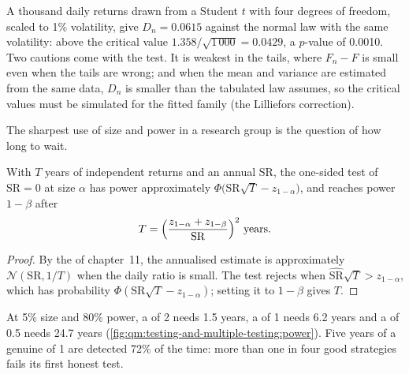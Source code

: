 A thousand daily returns drawn from a Student $t$ with four degrees of freedom, scaled to 1\% volatility, give $D_n = 0.0615$
against the normal law with the same volatility: above the critical value $1.358/\sqrt{1\,000} = 0.0429$, a $p$-value of
0.0010. Two cautions come with the test. It is weakest in the tails, where $F_n - F$ is small even when the tails are wrong;
and when the mean and variance are estimated from the same data, $D_n$ is smaller than the tabulated law assumes, so the
critical values must be simulated for the fitted family (the Lilliefors correction).

The sharpest use of size and power in a research group is the question of how long to wait.

\begin{proposition}\label{prop:qm:testing-and-multiple-testing:years}
With $T$ years of independent returns and an annual  $\mathrm{SR}$, the one-sided test of $\mathrm{SR} = 0$ at size
$\alpha$ has power approximately $\Phi\bigl(\mathrm{SR}\sqrt T - z_{1-\alpha}\bigr)$, and reaches power $1 - \beta$ after
\[
T = \Bigl(\frac{z_{1-\alpha} + z_{1-\beta}}{\mathrm{SR}}\Bigr)^2 \text{ years}.
\]
\end{proposition}

\begin{proof}
By the  of chapter~11, the annualised estimate is approximately $\mathcal N(\mathrm{SR}, 1/T)$ when the daily ratio is
small. The test rejects when $\widehat{\mathrm{SR}}\sqrt T > z_{1-\alpha}$, which has probability $\Phi(\mathrm{SR}\sqrt T - z_{1-\alpha})$;
setting it to $1 - \beta$ gives $T$.
\end{proof}

At 5\% size and 80\% power, a  of 2 needs 1.5 years, a  of 1 needs 6.2 years and a  of 0.5
needs 24.7 years (\cref{fig:qm:testing-and-multiple-testing:power}). Five years of a genuine  of 1 are detected 72\% of the time: more
than one in four good strategies fails its first honest test.

